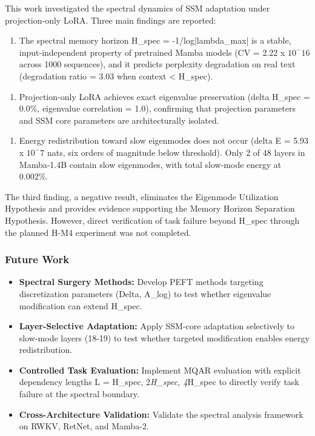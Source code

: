 
This work investigated the spectral dynamics of SSM adaptation under projection-only LoRA. Three main findings are reported:

\begin{enumerate}
\item The spectral memory horizon H\_spec = -1/log|lambda\_max| is a stable, input-independent property of pretrained Mamba models (CV = 2.22 x $10^-16$ across 1000 sequences), and it predicts perplexity degradation on real text (degradation ratio = 3.03 when context < H\_spec).
\end{enumerate}

\begin{enumerate}
\item Projection-only LoRA achieves exact eigenvalue preservation (delta H\_spec = 0.0\%, eigenvalue correlation = 1.0), confirming that projection parameters and SSM core parameters are architecturally isolated.
\end{enumerate}

\begin{enumerate}
\item Energy redistribution toward slow eigenmodes does not occur (delta E = 5.93 x $10^-7$ nats, six orders of magnitude below threshold). Only 2 of 48 layers in Mamba-1.4B contain slow eigenmodes, with total slow-mode energy at 0.002\%.
\end{enumerate}

The third finding, a negative result, eliminates the Eigenmode Utilization Hypothesis and provides evidence supporting the Memory Horizon Separation Hypothesis. However, direct verification of task failure beyond H\_spec through the planned H-M4 experiment was not completed.

\subsubsection{Future Work}

\begin{itemize}
\item \textbf{Spectral Surgery Methods:} Develop PEFT methods targeting discretization parameters (Delta, A\_log) to test whether eigenvalue modification can extend H\_spec.
\item \textbf{Layer-Selective Adaptation:} Apply SSM-core adaptation selectively to slow-mode layers (18-19) to test whether targeted modification enables energy redistribution.
\item \textbf{Controlled Task Evaluation:} Implement MQAR evaluation with explicit dependency lengths L = {H\_spec, 2\textit{H\_spec, 4}H\_spec} to directly verify task failure at the spectral boundary.
\item \textbf{Cross-Architecture Validation:} Validate the spectral analysis framework on RWKV, RetNet, and Mamba-2.
\end{itemize}
